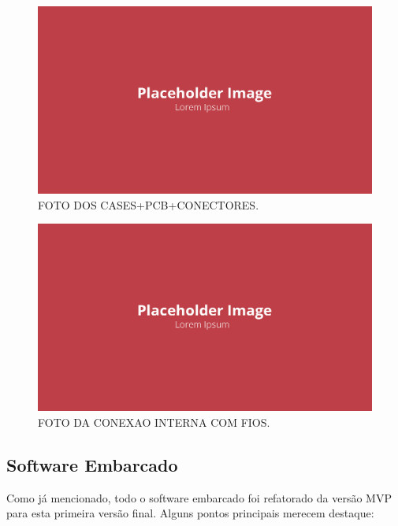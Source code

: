 \begin{figure}[!ht]
    \centering
    \includegraphics[width=.8\linewidth]{figuras/outras/placeholder.png}
    \caption{FOTO DOS CASES+PCB+CONECTORES\cite{autor}.}
    \label{fig:placeholder}
\end{figure}

\begin{figure}[!ht]
    \centering
    \includegraphics[width=.8\linewidth]{figuras/outras/placeholder.png}
    \caption{FOTO DA CONEXAO INTERNA COM FIOS\cite{autor}.}
    \label{fig:placeholder}
\end{figure}

\subsection{Software Embarcado}

Como já mencionado, todo o software embarcado foi refatorado da versão MVP para esta primeira versão final. Alguns pontos principais merecem destaque:

